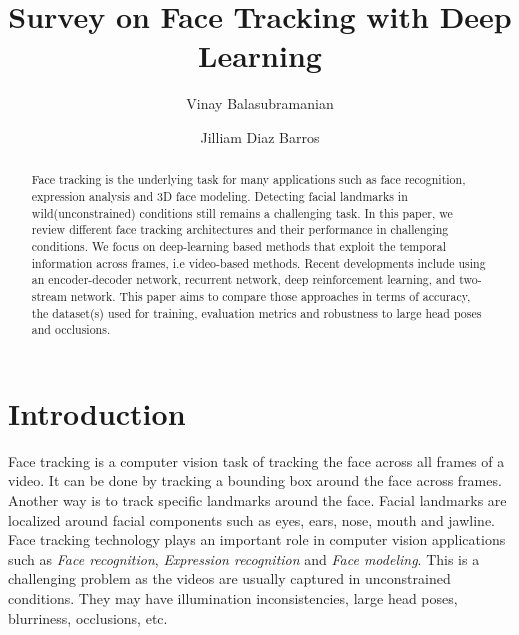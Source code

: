\documentclass{llncs}
\begin{document}
	
	\pagestyle{headings} %
	
	\title{Survey on Face Tracking with Deep Learning}
	\author{Vinay Balasubramanian \and Jilliam Diaz Barros}
	
	\maketitle %
	
	\begin{abstract}
		Face tracking is the underlying task for many applications such as face recognition, expression analysis and 3D face modeling. Detecting facial landmarks in wild(unconstrained) conditions still remains a challenging task. In this paper, we review different face tracking architectures and their performance in challenging conditions. We focus on deep-learning based methods that exploit the temporal information across frames, i.e video-based methods. Recent developments include using an encoder-decoder network, recurrent network, deep reinforcement learning, and two-stream network. This paper aims to compare those approaches in terms of accuracy, the dataset(s) used for training, evaluation metrics and robustness to large head poses and occlusions.
	\end{abstract}
	
	\section{Introduction}
	Face tracking is a computer vision task of tracking the face across all frames of a video. It can be done by tracking a bounding box around the face across frames. Another way is to track specific landmarks around the face.  Facial landmarks are localized around facial components such as eyes, ears, nose, mouth and jawline.
	Face tracking technology plays an important role in computer vision applications such as \textit{Face recognition}\cite{face_recognition}, \textit{Expression recognition}\cite{expression_recognition} and \textit{Face modeling}\cite{face_modeling}. This is a challenging problem as the videos are usually captured in unconstrained conditions. They may have illumination inconsistencies, large head poses, blurriness, occlusions, etc.
	
\end{document}
